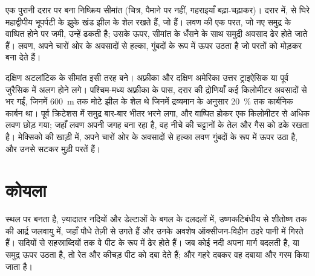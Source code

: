 \begin{omfigure}

{\small एक पुरानी दरार पर बना निष्क्रिय सीमांत (चित्र, पैमाने पर नहीं, गहराइयाँ
बढ़ा-चढ़ाकर)। दरार में,  से घिरे महाद्वीपीय भूपर्पटी के झुके खंड
झील के शेल रखते हैं, जो  हैं। लवण की एक परत, जो
नए समुद्र के वाष्पित होने पर जमी, उन्हें ढकती है; उसके ऊपर, सीमांत के धँसने के साथ समुद्री अवसाद ढेर
होते जाते हैं। लवण, अपने चारों ओर के अवसादों से हल्का, गुंबदों के रूप में
ऊपर उठता है जो परतों को मोड़कर  बना देते हैं।}
\end{omfigure}

दक्षिण अटलांटिक के सीमांत इसी तरह बने। अफ़्रीका और दक्षिण
अमेरिका उत्तर ट्राइऐसिक या पूर्व जुरैसिक में अलग होने लगे।
पश्चिम-मध्य अफ़्रीका के पास, दरार की द्रोणियाँ कई किलोमीटर
अवसादों से भर गईं, जिनमें \qty{600}{m} तक मोटे झील के शेल थे जिनमें द्रव्यमान के अनुसार
\qty{20}{\percent} तक कार्बनिक कार्बन था। पूर्व क्रिटेशस में समुद्र
बार-बार भीतर भरने लगा, और वाष्पित होकर एक
किलोमीटर से अधिक लवण छोड़ गया; जहाँ लवण अपनी जगह बना रहा है, वह नीचे की चट्टानों के तेल और
गैस को ढके रखता है। मेक्सिको की खाड़ी में, अपने चारों ओर के अवसादों से हल्का
लवण गुंबदों के रूप में ऊपर उठा है, और उनसे सटकर मुड़ी परतें
 हैं।

\section{कोयला}

 स्थल पर बनता है, ज़्यादातर नदियों और डेल्टाओं के बगल के दलदलों में, उष्णकटिबंधीय से
शीतोष्ण तक की आर्द्र जलवायु में, जहाँ पौधे तेज़ी से उगते हैं और उनके अवशेष
ऑक्सीजन-विहीन ठहरे पानी में गिरते हैं। सदियों से सहस्राब्दियों तक वे पीट के रूप में
ढेर होते हैं। जब कोई नदी अपना मार्ग बदलती है, या समुद्र ऊपर उठता है, तो रेत और कीचड़
पीट को दबा देते हैं; और गहरे दबकर वह दबाया और गरम किया जाता है।

